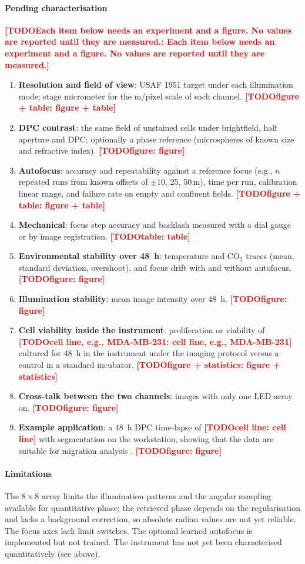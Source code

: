 \documentclass[preprint,12pt]{elsarticle}
\DeclareRobustCommand{\TODO}[1]{\textcolor{red}{\textbf{[TODO\ifx\relax#1\relax\else: #1\fi]}}}
\newcommand{\um}{\,\textmu m}
\begin{document}
\paragraph{Pending characterisation}
\TODO{Each item below needs an experiment and a figure. No values are
reported until they are measured.}
\begin{enumerate}
\item \textbf{Resolution and field of view}: USAF 1951 target under each
  illumination mode; stage micrometer for the \textmu m/pixel scale of
  each channel. \TODO{figure + table}
\item \textbf{DPC contrast}: the same field of unstained cells under
  brightfield, half aperture and DPC; optionally a phase reference
  (microspheres of known size and refractive index). \TODO{figure}
\item \textbf{Autofocus}: accuracy and repeatability against a reference
  focus (e.g., $n$ repeated runs from known offsets of $\pm$10, 25, 50\um),
  time per run, calibration linear range, and failure rate on empty and
  confluent fields. \TODO{figure + table}
\item \textbf{Mechanical}: focus step accuracy and backlash measured with a
  dial gauge or by image registration. \TODO{table}
\item \textbf{Environmental stability over 48~h}: temperature and CO$_2$
  traces (mean, standard deviation, overshoot), and focus drift with and
  without autofocus. \TODO{figure}
\item \textbf{Illumination stability}: mean image intensity over 48~h.
  \TODO{figure}
\item \textbf{Cell viability inside the instrument}: proliferation or
  viability of \TODO{cell line, e.g., MDA-MB-231} cultured for 48~h in the
  instrument under the imaging protocol versus a control in a standard
  incubator. \TODO{figure + statistics}
\item \textbf{Cross-talk between the two channels}: images with only one
  LED array on. \TODO{figure}
\item \textbf{Example application}: a 48~h DPC time-lapse of
  \TODO{cell line} with segmentation on the workstation, showing that the
  data are suitable for migration analysis \cite{WuWirtz2026Methods}.
  \TODO{figure}
\end{enumerate}

\paragraph{Limitations} The $8\times8$ array limits the illumination
patterns and the angular sampling available for quantitative phase; the
retrieved phase depends on the regularisation and lacks a background
correction, so absolute radian values are not yet reliable. The focus axes
lack limit switches. The optional learned autofocus is implemented but not
trained. The instrument has not yet been characterised quantitatively
(see above).
\end{document}
